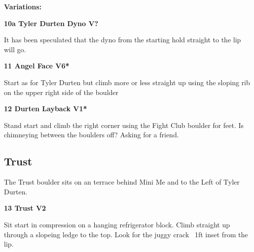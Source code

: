 \begin{multicols}{2}
\begin{adjustwidth}{0.5cm}{}				
\needspace{3cm}
\textbf{Variations:} \newline

\needspace{1.5cm}
\label{vr:Tyler Durten Dyno}
\colorbox{black!20}{
\parbox{0.95\linewidth}{
\textbf{
10a Tyler Durten Dyno V?  
}}}
\begin{adjustwidth}{0.5cm}{}			
It has been speculated that the dyno from the starting hold straight to the lip will go.
\end{adjustwidth}



\end{adjustwidth}


\needspace{1.5cm}
\label{rt:Angel Face}
\colorbox{RoyalBlue!20}{
\parbox{0.95\linewidth}{
\textbf{
11 Angel Face V6*  
}}}
\begin{adjustwidth}{0.5cm}{}			
Start as for Tyler Durten but climb more or less straight up using the sloping rib on the upper right side of the boulder
\end{adjustwidth}




\needspace{1.5cm}
\label{rt:Durten Layback}
\colorbox{green!20}{
\parbox{0.95\linewidth}{
\textbf{
12 Durten Layback V1*  
}}}
\begin{adjustwidth}{0.5cm}{}			
Stand start and climb the right corner using the Fight Club boulder for feet. Is chimneying between the boulders off? Asking for a friend.
\end{adjustwidth}





\needspace{1.5cm}
\subsection*{Trust}\label{bf:Trust}
The Trust boulder sits on an terrace behind Mini Me and to the Left of Tyler Durten.\\
	


\needspace{1.5cm}
\label{rt:Trust}
\colorbox{green!20}{
\parbox{0.95\linewidth}{
\textbf{
13 Trust V2  
}}}
\begin{adjustwidth}{0.5cm}{}			
Sit start in compression on a hanging refrigerator block. Climb straight up through a slopeing ledge to the top. Look for the juggy crack ~1ft inset from the lip.
\end{adjustwidth}



\end{multicols}
